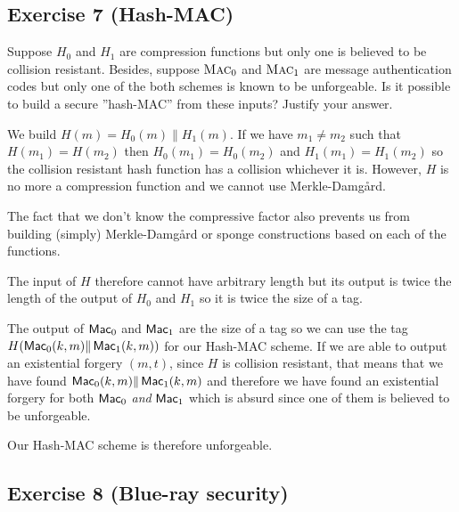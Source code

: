 \subsection{Exercise 7 (Hash-MAC)}

Suppose $H_0$ and $H_1$ are compression functions but only one is believed to be collision resistant.
Besides, suppose $\textsc{Mac}_0$ and $\textsc{Mac}_1$ are message authentication codes but only one
of the both schemes is known to be unforgeable. Is it possible to build a secure ''hash-MAC'' from these
inputs? Justify your answer.

\begin{solution}
	We build $H(m) = H_0(m)\|H_1(m)$.
	If we have $m_1 \neq m_2$ such that $H(m_1) = H(m_2)$ then $H_0(m_1) = H_0(m_2)$ and
	$H_1(m_1) = H_1(m_2)$ so the collision resistant hash function has a collision whichever it is.
	However, $H$ is no more a compression function and we cannot use Merkle-Damg\aa{}rd.

	The fact that we don't know the compressive factor also prevents us from building (simply) Merkle-Damg\aa{}rd or sponge constructions based on each of the functions.

	The input of $H$ therefore cannot have arbitrary length but its output is twice the length of the output of $H_0$ and $H_1$ so it is twice the size of a tag.

	The output of $\operatorname{\mathsf{Mac}}_0$ and $\operatorname{\mathsf{Mac}}_1$ are the size of a tag so we can use the tag
	$H(\operatorname{\mathsf{Mac}}_0(k,m)\|\operatorname{\mathsf{Mac}}_1(k,m))$ for our Hash-MAC scheme.
	If we are able to output an existential forgery $(m, t)$, since $H$ is collision resistant, that means that we have found $\operatorname{\mathsf{Mac}}_0(k,m)\|\operatorname{\mathsf{Mac}}_1(k,m)$ and therefore we have found an existential forgery for both $\operatorname{\mathsf{Mac}}_0$ \emph{and} $\operatorname{\mathsf{Mac}}_1$ which is absurd since one of them is believed to be unforgeable.

	Our Hash-MAC scheme is therefore unforgeable.
\end{solution}



\subsection{Exercise 8 (Blue-ray security)}

